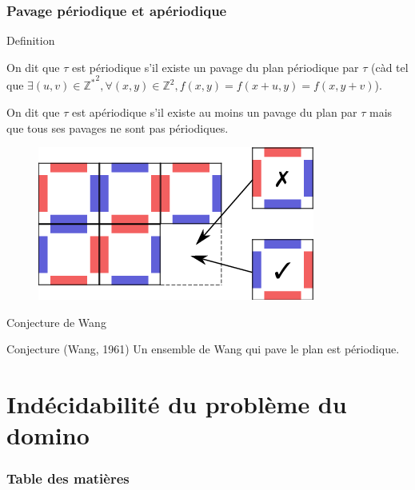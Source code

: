 \documentclass{beamer}
\newcommand{\Z}{\mathbb Z}
\begin{document}
\begin{frame}
\frametitle{Pavage périodique et apériodique}

\begin{alertblock}{Definition}

On dit que $\tau$ est périodique s'il existe un pavage du plan périodique par $\tau$
(càd tel que $\exists (u,v) \in {\Z^*}^2, \forall (x,y) \in \Z^2, f(x,y) = f(x+u,y)=f(x,y+v)$).

On dit que $\tau$ est apériodique s'il existe au moins un pavage du plan par $\tau$ mais que tous ses pavages ne sont pas périodiques.
    
\end{alertblock}

\begin{figure}

    \includegraphics[scale = 0.5]{pavage_periodique}
    \centering
    
\end{figure}

\end{frame}

\begin{frame}{Conjecture de Wang}

    \begin{block}{Conjecture (Wang, 1961)}
        Un ensemble de Wang qui pave le plan est périodique.
    \end{block}
    
    \end{frame}
    
    \section{Indécidabilité du problème du domino}
    
    \begin{frame}
        \frametitle{Table des matières}
        \tableofcontents[currentsection]
    \end{frame}
    
\end{document}
